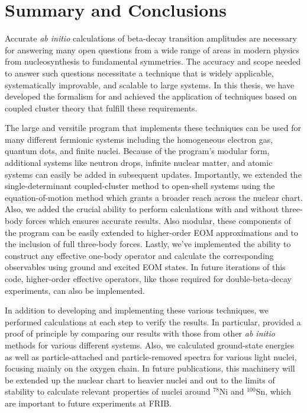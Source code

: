 \documentclass[../thesis.tex]{subfiles}
\begin{document}
\section{Summary and Conclusions}

Accurate \emph{ab initio} calculations of beta-decay transition amplitudes are necessary for answering many open questions from a wide range of areas in modern physics from nucleosynthesis to fundamental symmetries.  The accuracy and scope needed to answer such questions necessitate a technique that is widely applicable, systematically improvable, and scalable to large systems.  In this thesis, we have developed the formalism for and achieved the application of techniques based on coupled cluster theory that fulfill these requirements.

The large and versitile program that implements these techniques can be used for many different fermionic systems including the homogeneous electron gas, quantum dots, and finite nuclei.  Because of the program's modular form, additional systems like neutron drops, infinite nuclear matter, and atomic systems can easily be added in subsequent updates.  Importantly, we extended the single-determinant coupled-cluster method to open-shell systems using the equation-of-motion method which grants a broader reach across the nuclear chart.  Also, we added the crucial ability to perform calculations with and without three-body forces which ensures accurate results.  Also modular, these components of the program can be easily extended to higher-order EOM approximations and to the inclusion of full three-body forces.  Lastly, we've implemented the ability to construct any effective one-body operator and calculate the corresponding observables using ground and excited EOM states.  In future iterations of this code, higher-order effective operators, like those required for double-beta-decay experiments, can also be implemented.

In addition to developing and implementing these various techniques, we performed calculations at each step to verify the results.  In particular, provided a proof of principle by comparing our results with those from other \emph{ab initio} methods for various different systems.  Also, we calculated ground-state energies as well as particle-attached and particle-removed spectra for various light nuclei, focusing mainly on the oxygen chain.  In future publications, this machinery will be extended up the nuclear chart to heavier nuclei and out to the limits of stability to calculate relevant properties of nuclei around $^{78}$Ni and $^{100}$Sn, which are important to future experiments at FRIB.
\end{document}
